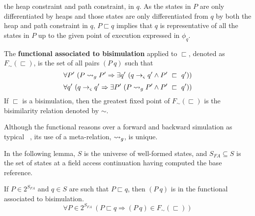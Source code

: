 the heap constraint and path constraint, in $q$. As the states in $P$
are only differentiated by heaps and those states are only
differentiated from $q$ by both the heap and path constraint in $q$,
$P \sqsubset q$ implies that $q$ is representative of all the states
in $P$ up to the given point of execution expressed in $\phi_q$.
\begin{definition}
\label{bisimulation}
The \textbf{functional associated to bisimulation} applied to $\sqsubset$, denoted as $F_\sim(\sqsubset)$, is the set of all pairs
$(P\ q)$ such that
\begin{equation}
\label{eqn:BisimulationForwards}
\forall P^\prime\ ( P \leadsto_{g} P^\prime \Rightarrow \exists q^\prime\ ( q \rightarrow_{\varsigma} q^\prime \wedge P^\prime\ \sqsubset\ q^\prime))
\end{equation}
\begin{equation}
\label{eqn:BisimulationBackwards}
\forall q^\prime\ ( q \rightarrow_{\varsigma} q^\prime\Rightarrow \exists P^\prime\ ( P \leadsto_{g} P^\prime \wedge P^\prime\ \sqsubset\ q^\prime))
\end{equation}
If $\sqsubset$ is a bisimulation, then the greatest fixed point of $F_\sim(\sqsubset)$ is the bisimilarity relation denoted by $\sim$.
\end{definition}
Although the functional reasons over a forward and backward
simulation as typical~ \cite{Sangiorgi:2011}, its use of a meta-relation, $\leadsto_{g}$, is unique. 

In the following lemma, $S$ is the universe of well-formed states, and $S_{FA} \subseteq S$ is the set of states at a field access continuation having computed the base reference.
\begin{lemma}
If $P \in 2^{S_\mathit{FA}}$ and $q \in S$ are such that $P \sqsubset q$, then $(P\ q)$ is in the functional associated to bisimulation.
\label{lem:access}
$$
\forall P \in 2^{S_\mathit{FA}}\ (P \sqsubset q \Rightarrow (P\ q) \in F_\sim(\sqsubset))
$$
\end{lemma}


